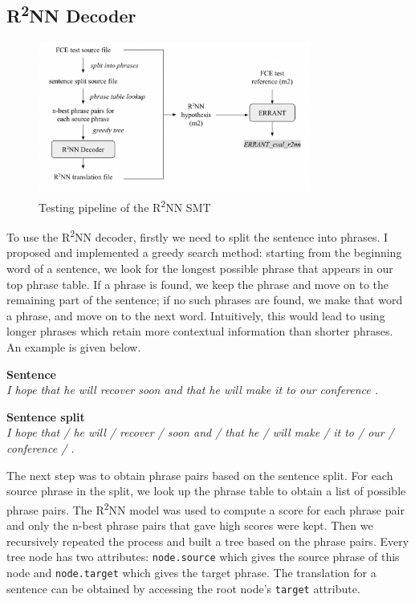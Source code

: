 \documentclass[12pt,a4paper,twoside,openright]{report}
\begin{document}
\subsection{\texorpdfstring{R\textsuperscript{2}NN}{R2NN} Decoder}\label{section:r2nn_test}
\begin{figure}[ht]
\centering
\includegraphics[width=0.8\textwidth]{images/r2nn_test.png}
\caption{Testing pipeline of the R\textsuperscript{2}NN SMT}
\label{fig:r2nn_test}
\end{figure}

To use the R\textsuperscript{2}NN decoder, firstly we need to split the sentence into phrases. I proposed and implemented a greedy search method: starting from the beginning word of a sentence, we look for the longest possible phrase that appears in our top phrase table. If a phrase is found, we keep the phrase and move on to the remaining part of the sentence; if no such phrases are found, we make that word a phrase, and move on to the next word. Intuitively, this would lead to using longer phrases which retain more contextual information than shorter phrases. An example is given below.

\textbf{Sentence}\\
\textit{I hope that he will recover soon and that he will make it to our conference .}

\textbf{Sentence split}\\
\textit{I hope that / he will / recover / soon and / that he / will make / it to / our / conference / .}

The next step was to obtain phrase pairs based on the sentence split. For each source phrase in the split, we look up the phrase table to obtain a list of possible phrase pairs. The R\textsuperscript{2}NN model was used to compute a score for each phrase pair and only the n-best phrase pairs that gave high scores were kept. Then we recursively repeated the process and built a tree based on the phrase pairs. Every tree node has two attributes: \texttt{node.source} which gives the source phrase of this node and \texttt{node.target} which gives the target phrase. The translation for a sentence can be obtained by accessing the root node's \texttt{target} attribute.
\end{document}
